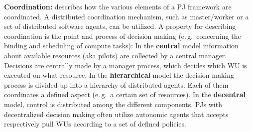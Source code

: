 \documentclass[conference,final]{IEEEtran}
\newcommand{\alnote}[1]{ {\textcolor{blue} { ***andre: #1 }}}
\newcommand{\alnote}[1]{}
\begin{document}
\textbf{Coordination:} describes how the various elements of a PJ framework are
coordinated. %
A distributed coordination mechanism, such as master/worker or a set
of distributed software agents, can be utilized. A property for
describing coordination is the point and process of decision making
(e.\,g.\ concerning the binding and scheduling of compute tasks): In
the \textbf{central} model information about available resources (aka
pilots) are collected by a central manager. Decisions are centrally
made by a manager process, which decides which WU is executed on what
resource. In the \textbf{hierarchical} model the decision making
process is divided up into a hierarchy of distributed agents. Each of
them coordinates a defined aspect (e.\,g.\ a certain set of
resources). In the \textbf{decentral} model, control is distributed
among the different components.  PJs with decentralized decision
making often utilize autonomic agents that accepts respectively pull
WUs according to a set of defined policies.




% 
\end{document}

